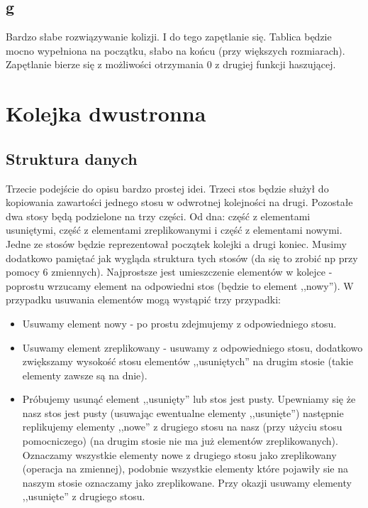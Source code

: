 \documentclass[a4paper,12pt]{article}
\begin{document}
\subsection{g}
Bardzo słabe rozwiązywanie kolizji. I do tego zapętlanie się. Tablica będzie mocno wypełniona na początku, słabo na końcu (przy większych rozmiarach). Zapętlanie bierze się z możliwości otrzymania 0 z drugiej funkcji haszującej.
\section{Kolejka dwustronna}
\subsection*{Struktura danych}
Trzecie podejście do opisu bardzo prostej idei. Trzeci stos będzie służył do kopiowania zawartości jednego stosu w odwrotnej kolejności na drugi. Pozostałe dwa stosy będą podzielone na trzy części. Od dna: część z elementami usuniętymi, część z elementami zreplikowanymi i część z elementami nowymi. Jedne ze stosów będzie reprezentował początek kolejki a drugi koniec. Musimy dodatkowo pamiętać jak wygląda struktura tych stosów (da się to zrobić np przy pomocy 6 zmiennych). Najprostsze jest umieszczenie elementów w kolejce - poprostu wrzucamy element na odpowiedni stos (będzie to element ,,nowy''). W przypadku usuwania elementów mogą wystąpić trzy przypadki:
\begin{itemize}
 \item Usuwamy element nowy - po prostu zdejmujemy z odpowiedniego stosu.
 \item Usuwamy element zreplikowany - usuwamy z odpowiedniego stosu, dodatkowo zwiększamy wysokość stosu elementów ,,usuniętych'' na drugim stosie (takie elementy zawsze są na dnie).
 \item Próbujemy usunąć element ,,usunięty'' lub stos jest pusty. Upewniamy się że nasz stos jest pusty (usuwając ewentualne elementy ,,usunięte'') następnie replikujemy elementy ,,nowe'' z drugiego stosu na nasz (przy użyciu stosu pomocniczego) (na drugim stosie nie ma już elementów zreplikowanych). Oznaczamy wszystkie elementy nowe z drugiego stosu jako zreplikowany (operacja na zmiennej), podobnie wszystkie elementy które pojawiły sie na naszym stosie oznaczamy jako zreplikowane. Przy okazji usuwamy elementy ,,usunięte'' z drugiego stosu.
\end{itemize}
\end{document}
